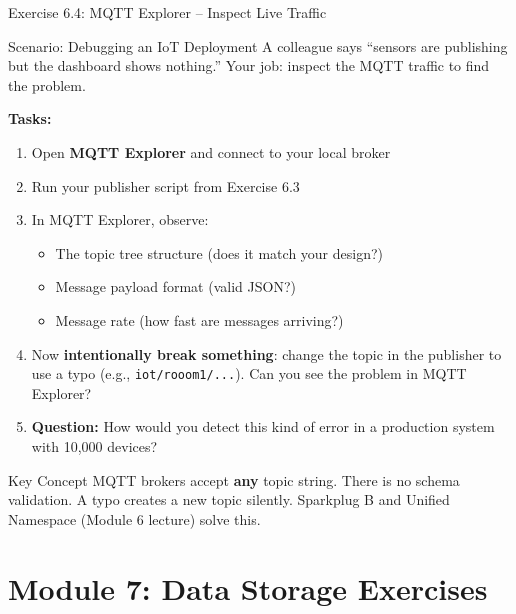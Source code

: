 \documentclass[aspectratio=169,11pt]{beamer}
\begin{document}
\begin{frame}{Exercise 6.4: MQTT Explorer -- Inspect Live Traffic}
    \begin{block}{Scenario: Debugging an IoT Deployment}
        A colleague says ``sensors are publishing but the dashboard shows nothing.'' Your job: inspect the MQTT traffic to find the problem.
    \end{block}

    \vspace{0.2cm}
    \textbf{Tasks:}
    \begin{enumerate}
        \item Open \textbf{MQTT Explorer} and connect to your local broker
        \item Run your publisher script from Exercise 6.3
        \item In MQTT Explorer, observe:
        \begin{itemize}
            \item The topic tree structure (does it match your design?)
            \item Message payload format (valid JSON?)
            \item Message rate (how fast are messages arriving?)
        \end{itemize}
        \item Now \textbf{intentionally break something}: change the topic in the publisher to use a typo (e.g., \texttt{iot/rooom1/...}). Can you see the problem in MQTT Explorer?
        \item \textbf{Question:} How would you detect this kind of error in a production system with 10,000 devices?
    \end{enumerate}

    \vspace{0.1cm}
    \begin{alertblock}{Key Concept}
        MQTT brokers accept \textbf{any} topic string. There is no schema validation. A typo creates a new topic silently. Sparkplug B and Unified Namespace (Module 6 lecture) solve this.
    \end{alertblock}
\end{frame}

\section{Module 7: Data Storage Exercises}
\end{document}

